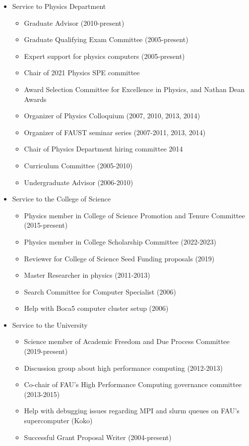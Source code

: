 \documentclass[11pt]{article}
\begin{document}
\begin{itemize}
\item	Service to Physics Department
	\begin{itemize}
	\item	Graduate Advisor (2010-present)
	\item	Graduate Qualifying Exam Committee (2005-present)
	\item	Expert support for physics computers (2005-present)
	\item	Chair of 2021 Physics SPE committee
	\item	Award Selection Committee for Excellence in Physics, and Nathan
		Dean Awards
	\item	Organizer of Physics Colloquium (2007, 2010, 2013, 2014)
	\item	Organizer of FAUST seminar series (2007-2011, 2013, 2014)
	\item	Chair of Physics Department hiring committee 2014
	\item	Curriculum Committee (2005-2010)
	\item 	Undergraduate Advisor (2006-2010)
	\end{itemize}
\item	Service to the College of Science
	\begin{itemize}
	\item	Physics member in College of Science Promotion and
		Tenure Committee (2015-present)
	\item	Physics member in College Scholarship Committee (2022-2023)
	\item	Reviewer for College of Science Seed Funding
		proposals (2019)
	\item	Master Researcher in physics (2011-2013)
	\item	Search Committee for Computer Specialist (2006)
	\item	Help with Boca5 computer cluster setup (2006)
	\end{itemize}
\item	Service to the University
	\begin{itemize}
	\item	Science member of Academic Freedom and Due Process
		Committee (2019-present)
	\item	Discussion group about high performance computing (2012-2013)
	\item	Co-chair of FAU's High Performance Computing  
		governance committee (2013-2015)
	\item	Help with debugging issues regarding MPI and slurm queues
		on FAU's supercomputer (Koko)
	\item	Successful Grant Proposal Writer (2004-present)
	\end{itemize}
\end{itemize}
\end{document}
